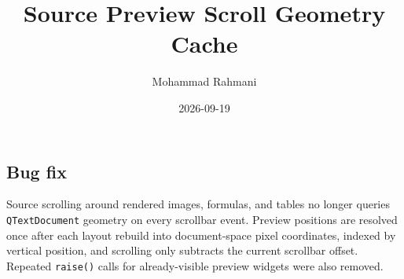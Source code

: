 \documentclass[a4paper]{article}
\title{Source Preview Scroll Geometry Cache}
\date{2026-09-19}
\author{Mohammad Rahmani}
\begin{document}
\maketitle

\begin{preview}
\section{Bug fix}

Source scrolling around rendered images, formulas, and tables no longer queries
\texttt{QTextDocument} geometry on every scrollbar event. Preview positions are
resolved once after each layout rebuild into document-space pixel coordinates,
indexed by vertical position, and scrolling only subtracts the current scrollbar
offset. Repeated \texttt{raise()} calls for already-visible preview widgets were
also removed.

\end{preview}
\end{document}
